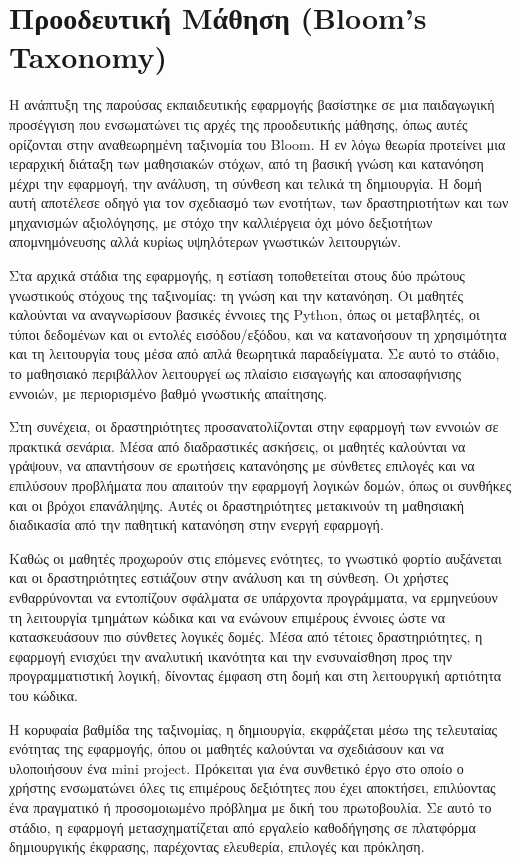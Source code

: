 \documentclass[11pt]{report}
\begin{document}
\section{Προοδευτική Μάθηση (Bloom’s Taxonomy)}

Η ανάπτυξη της παρούσας εκπαιδευτικής εφαρμογής βασίστηκε σε μια παιδαγωγική προσέγγιση που ενσωματώνει τις αρχές της προοδευτικής μάθησης, όπως αυτές ορίζονται στην αναθεωρημένη ταξινομία του Bloom. Η εν λόγω θεωρία προτείνει μια ιεραρχική διάταξη των μαθησιακών στόχων, από τη βασική γνώση και κατανόηση μέχρι την εφαρμογή, την ανάλυση, τη σύνθεση και τελικά τη δημιουργία. Η δομή αυτή αποτέλεσε οδηγό για τον σχεδιασμό των ενοτήτων, των δραστηριοτήτων και των μηχανισμών αξιολόγησης, με στόχο την καλλιέργεια όχι μόνο δεξιοτήτων απομνημόνευσης αλλά κυρίως υψηλότερων γνωστικών λειτουργιών. 

Στα αρχικά στάδια της εφαρμογής, η εστίαση τοποθετείται στους δύο πρώτους γνωστικούς στόχους της ταξινομίας: τη γνώση και την κατανόηση. Οι μαθητές καλούνται να αναγνωρίσουν βασικές έννοιες της Python, όπως οι μεταβλητές, οι τύποι δεδομένων και οι εντολές εισόδου/εξόδου, και να κατανοήσουν τη χρησιμότητα και τη λειτουργία τους μέσα από απλά θεωρητικά παραδείγματα. Σε αυτό το στάδιο, το μαθησιακό περιβάλλον λειτουργεί ως πλαίσιο εισαγωγής και αποσαφήνισης εννοιών, με περιορισμένο βαθμό γνωστικής απαίτησης. 

Στη συνέχεια, οι δραστηριότητες προσανατολίζονται στην εφαρμογή των εννοιών σε πρακτικά σενάρια. Μέσα από διαδραστικές ασκήσεις, οι μαθητές καλούνται να γράψουν, να απαντήσουν σε ερωτήσεις κατανόησης με σύνθετες επιλογές και να επιλύσουν προβλήματα που απαιτούν την εφαρμογή λογικών δομών, όπως οι συνθήκες και οι βρόχοι επανάληψης. Αυτές οι δραστηριότητες μετακινούν τη μαθησιακή διαδικασία από την παθητική κατανόηση στην ενεργή εφαρμογή. 

Καθώς οι μαθητές προχωρούν στις επόμενες ενότητες, το γνωστικό φορτίο αυξάνεται και οι δραστηριότητες εστιάζουν στην ανάλυση και τη σύνθεση. Οι χρήστες ενθαρρύνονται να εντοπίζουν σφάλματα σε υπάρχοντα προγράμματα, να ερμηνεύουν τη λειτουργία τμημάτων κώδικα και να ενώνουν επιμέρους έννοιες ώστε να κατασκευάσουν πιο σύνθετες λογικές δομές. Μέσα από τέτοιες δραστηριότητες, η εφαρμογή ενισχύει την αναλυτική ικανότητα και την ενσυναίσθηση προς την προγραμματιστική λογική, δίνοντας έμφαση στη δομή και στη λειτουργική αρτιότητα του κώδικα. 

Η κορυφαία βαθμίδα της ταξινομίας, η δημιουργία, εκφράζεται μέσω της τελευταίας ενότητας της εφαρμογής, όπου οι μαθητές καλούνται να σχεδιάσουν και να υλοποιήσουν ένα mini project. Πρόκειται για ένα συνθετικό έργο στο οποίο ο χρήστης ενσωματώνει όλες τις επιμέρους δεξιότητες που έχει αποκτήσει, επιλύοντας ένα πραγματικό ή προσομοιωμένο πρόβλημα με δική του πρωτοβουλία. Σε αυτό το στάδιο, η εφαρμογή μετασχηματίζεται από εργαλείο καθοδήγησης σε πλατφόρμα δημιουργικής έκφρασης, παρέχοντας ελευθερία, επιλογές και πρόκληση. 
\end{document}
